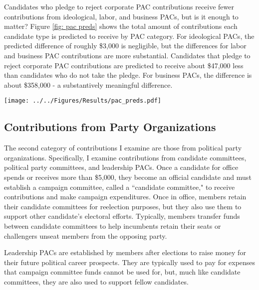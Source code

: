 \documentclass[12pt]{article}
\begin{document}
Candidates who pledge to reject corporate PAC contributions receive fewer contributions from ideological, labor, and business PACs, but is it enough to matter? Figure \ref{fig: pac preds} shows the total amount of contributions each candidate type is predicted to receive by PAC category. For ideological PACs, the predicted difference of roughly \$3,000 is negligible, but the differences for labor and business PAC contributions are more substantial. Candidates that pledge to reject corporate PAC contributions are predicted to receive about \$47,000 less than candidates who do not take the pledge. For business PACs, the difference is about \$358,000 - a substantively meaningful difference.  

\begin{figure*}[!htb]
    \centering
    \texttt{[image: ../../Figures/Results/pac\_preds.pdf]}
    \caption{\textbf{Total Predicted Contributions from Each PAC by Candidate Type.} This figure shows that candidates who pledge to reject PAC contributions are predicted to received fewer contributions from PACs, but the difference is largest for contributions from business PACs.}
    \label{fig: pac preds}
\end{figure*}


\subsection{Contributions from Party Organizations}

The second category of contributions I examine are those from political party organizations. Specifically, I examine contributions from candidate committees, political party committees, and leadership PACs. Once a candidate for office spends or receives more than \$5,000, they become an official candidate and must establish a campaign committee, called a ``candidate committee," to receive contributions and make campaign expenditures. Once in office, members retain their candidate committees for reelection purposes, but they also use them to support other candidate's electoral efforts. Typically, members transfer funds between candidate committees to help incumbents retain their seats or challengers unseat members from the opposing party. 

Leadership PACs are established by members after elections to raise money for their future political career prospects. They are typically used to pay for expenses that campaign committee funds cannot be used for, but, much like candidate committees, they are also used to support fellow candidates. 
\end{document}
